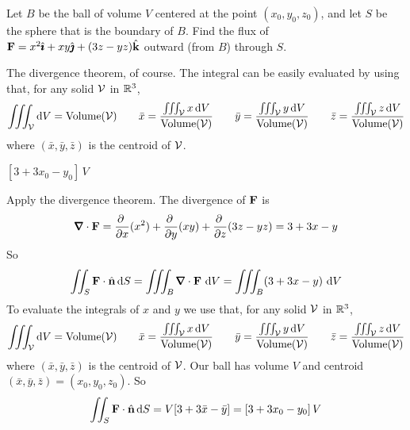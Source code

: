 \begin{question}
Let $B$ be the ball of volume $V$ centered at the point 
$(x_0, y_0, z_0)$, and let $S$ be the sphere that is the boundary of $B$.  
Find the flux of $\mathbf{F} = x^2\hat{\pmb{\imath}} + xy\hat{\pmb{\jmath}}+(3 z - yz)\hat{\mathbf{k}}$ outward (from $B$) 
through $S$. 
\end{question}

\begin{hint} 
The divergence theorem, of course.
The integral can be easily evaluated by using that, 
for any solid $\mathcal{V}$ in $\mathbb{R}^3$,
\begin{align*}
\iiint_{\mathcal{V}}\mathrm{d}V=\text{Volume}(\mathcal{V})\qquad
\bar x =\frac{\iiint_{\mathcal{V}} x\,\mathrm{d}V}{\text{Volume}(\mathcal{V})}\qquad
\bar y =\frac{\iiint_{\mathcal{V}} y\,\mathrm{d}V}{\text{Volume}(\mathcal{V})}\qquad
\bar z =\frac{\iiint_{\mathcal{V}} z\,\mathrm{d}V}{\text{Volume}(\mathcal{V})}
\end{align*}
where $(\bar x,\bar y,\bar z)$ is the centroid of $\mathcal{V}$.
\end{hint}

\begin{answer} 
$[3+3x_0-y_0]\,V$
\end{answer}

\begin{solution}
Apply the divergence theorem.  The divergence of $\mathbf{F}$ is
\begin{equation*}
\vnabla\cdot\vF = \pdiff{}{x}(x^2)
+\pdiff{}{y}(xy)
+\pdiff{}{z}(3 z - yz)
=3+3x-y
\end{equation*}
So
\begin{align*}
\dblInt_S\vF\cdot\hn\,\dee{S}
=\tripInt_B\vnabla\cdot\vF\ \dee{V}
=\tripInt_B(3+3x-y)\ \dee{V}
\end{align*}
To evaluate the integrals of $x$ and $y$ we use that, for any solid $\mathcal{V}$
in $\mathbb{R}^3$,
\begin{align*}
\iiint_{\mathcal{V}}\mathrm{d}V=\text{Volume}(\mathcal{V})\qquad
\bar x =\frac{\iiint_{\mathcal{V}} x\,\mathrm{d}V}{\text{Volume}(\mathcal{V})}\qquad
\bar y =\frac{\iiint_{\mathcal{V}} y\,\mathrm{d}V}{\text{Volume}(\mathcal{V})}\qquad
\bar z =\frac{\iiint_{\mathcal{V}} z\,\mathrm{d}V}{\text{Volume}(\mathcal{V})}
\end{align*}
where $(\bar x,\bar y,\bar z)$ is the centroid of $\mathcal{V}$.
Our ball has volume $V$ and centroid
$(\bar x,\bar y,\bar z) = (x_0,y_0,z_0)$.
So
\begin{align*}
\iint_S\mathbf{F}\cdot\hat{\mathbf{n}}\,\mathrm{d}S
= V[3+3\bar x-\bar y]
=[3+3x_0-y_0]\,V
\end{align*}
\end{solution}




